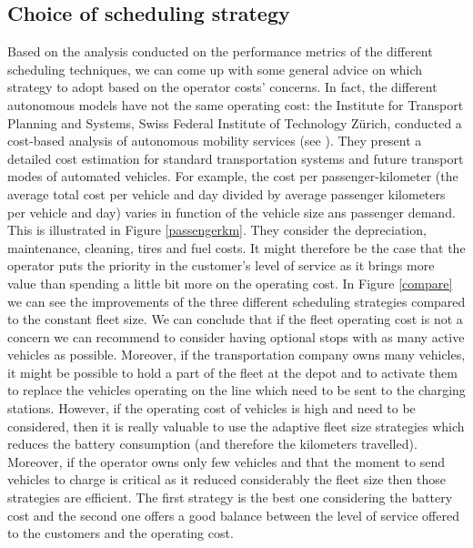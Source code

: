 \documentclass[12pt,a4paper]{article}
\begin{document}
\subsection{Choice of scheduling strategy}\label{comparestrat}
Based on the analysis conducted on the performance metrics of the different scheduling techniques, we can come up with some general advice on which strategy to adopt based on the operator costs' concerns. In fact, the different autonomous models have not the same operating cost: the Institute for Transport Planning and Systems, Swiss Federal Institute of Technology Zürich, conducted a cost-based analysis of autonomous mobility services (see \cite{ethz}). They present a detailed cost estimation for standard transportation systems and future transport modes of automated vehicles. For example, the cost per passenger-kilometer (the average total cost per vehicle and day divided by average passenger kilometers per vehicle and day) varies in function of the vehicle size ans passenger demand. This is illustrated in Figure \ref{passengerkm}. They consider the depreciation, maintenance, cleaning, tires and fuel costs. It might therefore be the case that the operator puts the priority in the customer's level of service as it brings more value than spending a little bit more on the operating cost. In Figure \ref{compare} we can see the improvements of the three different scheduling strategies compared to the constant fleet size. We can conclude that if the fleet operating cost is not a concern we can recommend to consider having optional stops with as many active vehicles as possible. Moreover, if the transportation company owns many vehicles, it might be possible to hold a part of the fleet at the depot and to activate them to replace the vehicles operating on the line which need to be sent to the charging stations. However, if the operating cost of vehicles is high and need to be considered, then it is really valuable to use the adaptive fleet size strategies which reduces the battery consumption (and therefore the kilometers travelled). Moreover, if the operator owns only few vehicles and that the moment to send vehicles to charge is critical as it reduced considerably the fleet size then those strategies are efficient. The first strategy is the best one considering the battery cost and the second one offers a good balance between the level of service offered to the customers and the operating cost.
 
\end{document}
